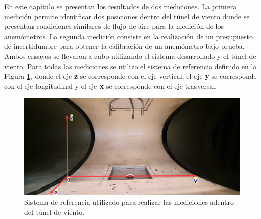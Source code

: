 



En este capítulo se presentan los resultados de dos mediciones. La primera medición permite identificar dos posiciones dentro del túnel de viento donde se presentan condiciones similares de flujo de aire para la medición de los anemómetros. La segunda medición consiste en la realización de un presupuesto de incertidumbre para obtener la calibración de un anemómetro bajo prueba. Ambos ensayos se llevaron a cabo utilizando el sistema desarrollado y el túnel de viento. Para todas las mediciones se utilizo el sistema de referencia definido en la Figura \ref{fig:sisReferenciaZmed}, donde el eje \textbf{z} se corresponde con el eje vertical, el eje \textbf{y} se corresponde con el eje longitudinal y el eje \textbf{x} se corresponde con el eje trasversal.

\begin{figure}[H]
    \centering
    \includegraphics[width=0.9\linewidth]{Figuras/resultados/sisReferenciaZmed.png}
    \caption{Sistema de referencia utilizado para realizar las mediciones adentro del túnel de viento.}
    \label{fig:sisReferenciaZmed}
\end{figure}
